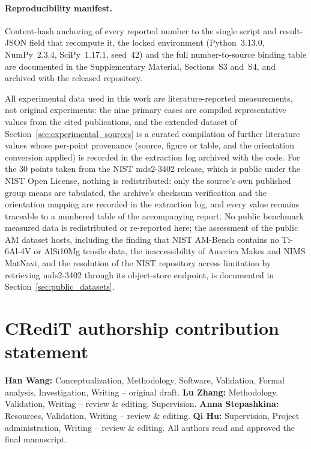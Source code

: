 \paragraph{Reproducibility manifest.} Content-hash anchoring of every reported number to the single script and result-JSON field that recompute it, the locked environment (Python~3.13.0, NumPy~2.3.4, SciPy~1.17.1, seed~42) and the full number-to-source binding table are documented in the Supplementary Material, Sections~S3 and~S4, and archived with the released repository.

All experimental data used in this work are literature-reported measurements, not original experiments: the nine primary cases are compiled representative values from the cited publications, and the extended dataset of Section~\ref{sec:experimental_sources} is a curated compilation of further literature values whose per-point provenance (source, figure or table, and the orientation conversion applied) is recorded in the extraction log archived with the code. For the 30 points taken from the NIST mds2-3402 release, which is public under the NIST Open License, nothing is redistributed: only the source's own published group means are tabulated, the archive's checksum verification and the orientation mapping are recorded in the extraction log, and every value remains traceable to a numbered table of the accompanying report. No public benchmark measured data is redistributed or re-reported here; the assessment of the public AM dataset hosts, including the finding that NIST AM-Bench contains no Ti-6Al-4V or AlSi10Mg tensile data, the inaccessibility of America Makes and NIMS MatNavi, and the resolution of the NIST repository access limitation by retrieving mds2-3402 through its object-store endpoint, is documented in Section~\ref{sec:public_datasets}.

\section*{CRediT authorship contribution statement}

\textbf{Han Wang:} Conceptualization, Methodology, Software, Validation, Formal analysis, Investigation, Writing -- original draft. \textbf{Lu Zhang:} Methodology, Validation, Writing -- review \& editing, Supervision. \textbf{Anna Stepashkina:} Resources, Validation, Writing -- review \& editing. \textbf{Qi Hu:} Supervision, Project administration, Writing -- review \& editing. All authors read and approved the final manuscript.

